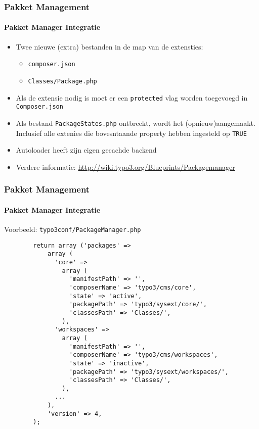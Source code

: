 \begin{frame}[fragile]
	\frametitle{Pakket Management}
	\framesubtitle{Pakket Manager Integratie}

	\begin{itemize}

		\item Twee nieuwe (extra) bestanden in de map van de extensties:

			\begin{itemize}
				\item \texttt{composer.json}
				\item \texttt{Classes/Package.php}
			\end{itemize}

		\item Als de extensie nodig is moet er een \texttt{protected} vlag \newline
			worden toegevoegd in \texttt{Composer.json}

		\item Als bestand \texttt{PackageStates.php} ontbreekt, wordt het (opnieuw)aangemaakt.\newline
			Inclusief alle extenies die bovesntaande property hebben ingesteld op \texttt{TRUE}

		\item Autoloader heeft zijn eigen gecachde backend

		\item Verdere informatie:\newline
			\url{http://wiki.typo3.org/Blueprints/Packagemanager}

	\end{itemize}

\end{frame}


\begin{frame}[fragile]
	\frametitle{Pakket Management}
	\framesubtitle{Pakket Manager Integratie}

	Voorbeeld: \texttt{typo3conf/PackageManager.php}

	\lstset{
		basicstyle=\tiny\ttfamily
	}

	\begin{lstlisting}
		return array ('packages' =>
		    array (
		      'core' =>
		        array (
		          'manifestPath' => '',
		          'composerName' => 'typo3/cms/core',
		          'state' => 'active',
		          'packagePath' => 'typo3/sysext/core/',
		          'classesPath' => 'Classes/',
		        ),
		      'workspaces' =>
		        array (
		          'manifestPath' => '',
		          'composerName' => 'typo3/cms/workspaces',
		          'state' => 'inactive',
		          'packagePath' => 'typo3/sysext/workspaces/',
		          'classesPath' => 'Classes/',
		        ),
		      ...
		    ),
		    'version' => 4,
		);
	\end{lstlisting}

\end{frame}

